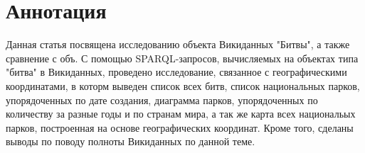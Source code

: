 \section{Аннотация}

Данная статья посвящена исследованию объекта Викиданных "Битвы", а также сравнение с объ. С помощью SPARQL-запросов, вычисляемых на объектах типа "битва" в Викиданных, проведено исследование, связанное с географическими координатами, в которм выведен список всех битв, список национальных парков, упорядоченных по дате создания, диаграмма парков, упорядоченных по количеству за разные годы и по странам мира, а так же карта всех национальых парков, построенная на основе географических координат. Кроме того, сделаны выводы по поводу полноты Викиданных по данной теме.